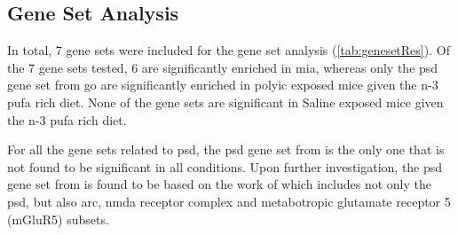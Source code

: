 \subsection{Gene Set Analysis}
In total, 7 gene sets were included for the gene set analysis (\cref{tab:genesetRes}).
Of the 7 gene sets tested, 6 are significantly enriched in \gls{mia}, whereas only the \gls{psd} gene set from \gls{go} are significantly enriched in \gls{polyic} exposed mice given the n-3 \gls{pufa} rich diet. 
None of the gene sets are significant in Saline exposed mice given the n-3 \gls{pufa} rich diet. 

For all the gene sets related to \gls{psd}, the \gls{psd} gene set from \citet{Purcell2014} is the only one that is not found to be significant in all conditions.
Upon further investigation, the \gls{psd} gene set from \citet{Purcell2014} is found to be based on the work of \citet{Kirov2012} which includes not only the \gls{psd}, but also \gls{arc}, \gls{nmda} receptor complex and metabotropic glutamate receptor 5 (mGluR5) subsets.

